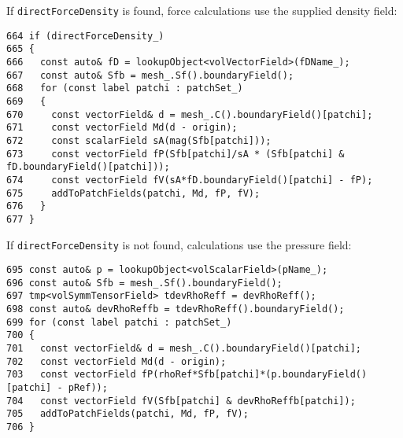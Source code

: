 If \texttt{directForceDensity} is found, force calculations use the supplied density field:\
\begin{lstlisting}
664 if (directForceDensity_)
665 {
666   const auto& fD = lookupObject<volVectorField>(fDName_);
667   const auto& Sfb = mesh_.Sf().boundaryField();
668   for (const label patchi : patchSet_)
669   {
670     const vectorField& d = mesh_.C().boundaryField()[patchi];
671     const vectorField Md(d - origin);
672     const scalarField sA(mag(Sfb[patchi]));
673     const vectorField fP(Sfb[patchi]/sA * (Sfb[patchi] & fD.boundaryField()[patchi]));
674     const vectorField fV(sA*fD.boundaryField()[patchi] - fP);
675     addToPatchFields(patchi, Md, fP, fV);
676   }
677 }
\end{lstlisting}

If \texttt{directForceDensity} is not found, calculations use the pressure field:\
\begin{lstlisting}
695 const auto& p = lookupObject<volScalarField>(pName_);
696 const auto& Sfb = mesh_.Sf().boundaryField();
697 tmp<volSymmTensorField> tdevRhoReff = devRhoReff();
698 const auto& devRhoReffb = tdevRhoReff().boundaryField();
699 for (const label patchi : patchSet_)
700 {
701   const vectorField& d = mesh_.C().boundaryField()[patchi];
702   const vectorField Md(d - origin);
703   const vectorField fP(rhoRef*Sfb[patchi]*(p.boundaryField()[patchi] - pRef));
704   const vectorField fV(Sfb[patchi] & devRhoReffb[patchi]);
705   addToPatchFields(patchi, Md, fP, fV);
706 }
\end{lstlisting}

